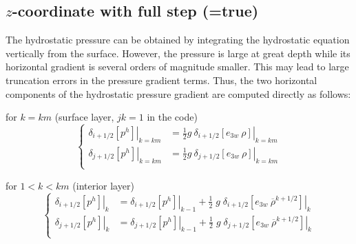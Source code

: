 \subsection   [$z$-coordinate with full step (\np{ln\_dynhpg\_zco}) ]
			{$z$-coordinate with full step (=true)}
\label{DYN_hpg_zco}

The hydrostatic pressure can be obtained by integrating the hydrostatic equation 
vertically from the surface. However, the pressure is large at great depth while its 
horizontal gradient is several orders of magnitude smaller. This may lead to large 
truncation errors in the pressure gradient terms. Thus, the two horizontal components 
of the hydrostatic pressure gradient are computed directly as follows:

for $k=km$ (surface layer, $jk=1$ in the code)
\begin{equation} \label{Eq_dynhpg_zco_surf}
\left\{ \begin{aligned}
					\left. \delta _{i+1/2} \left[  p^h 			 \right] \right|_{k=km} 
&= \frac{1}{2} g \ 	\left. \delta _{i+1/2} \left[  e_{3w} \ \rho \right] \right|_{k=km}   \\
     					\left. \delta _{j+1/2} \left[  p^h  			 \right] \right|_{k=km} 
&= \frac{1}{2} g \ 	\left. \delta _{j+1/2} \left[  e_{3w} \ \rho \right] \right|_{k=km}   \\
\end{aligned} \right.
\end{equation} 

for $1<k<km$ (interior layer)
\begin{equation} \label{Eq_dynhpg_zco}
\left\{ \begin{aligned}
					\left. \delta _{i+1/2} \left[  p^h 			 \right] \right|_{k} 
&=					\left. \delta _{i+1/2} \left[  p^h 			 \right] \right|_{k-1} 
+    \frac{1}{2}\;g\;	\left. \delta _{i+1/2} \left[  e_{3w} \ \overline {\rho}^{k+1/2} \right] \right|_{k}   \\
     					\left. \delta _{j+1/2} \left[  p^h  			 \right] \right|_{k} 
&=     				\left. \delta _{j+1/2} \left[  p^h  			 \right] \right|_{k-1} 
+    \frac{1}{2}\;g\;	\left. \delta _{j+1/2} \left[  e_{3w} \ \overline {\rho}^{k+1/2} \right] \right|_{k}   \\
\end{aligned} \right.
\end{equation} 


